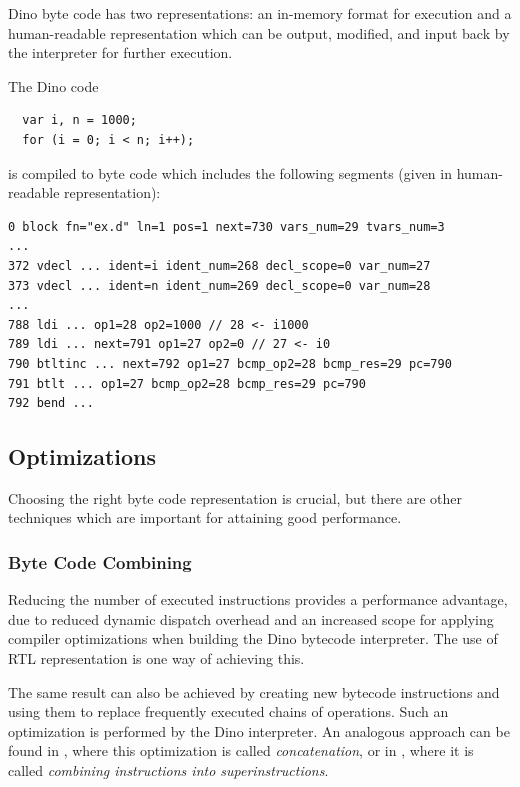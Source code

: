 \documentclass[preprint]{sigplanconf}
\begin{document}
  Dino byte code has two representations: an in-memory format for execution
and a human-readable representation which can be output, modified, and input
back by the interpreter for further execution.

  The Dino code

{\footnotesize
\begin{verbatim}
  var i, n = 1000;
  for (i = 0; i < n; i++);
\end{verbatim}
}

  is compiled to byte code which includes the following segments (given in human-readable representation):
 
{\scriptsize
\begin{verbatim}
0 block fn="ex.d" ln=1 pos=1 next=730 vars_num=29 tvars_num=3
...
372 vdecl ... ident=i ident_num=268 decl_scope=0 var_num=27
373 vdecl ... ident=n ident_num=269 decl_scope=0 var_num=28
...
788 ldi ... op1=28 op2=1000 // 28 <- i1000
789 ldi ... next=791 op1=27 op2=0 // 27 <- i0
790 btltinc ... next=792 op1=27 bcmp_op2=28 bcmp_res=29 pc=790
791 btlt ... op1=27 bcmp_op2=28 bcmp_res=29 pc=790
792 bend ...
\end{verbatim}
}


\subsection{Optimizations}

  Choosing the right byte code representation is
crucial, but there are other techniques %
which are important for attaining good performance.

\subsubsection{Byte Code Combining}

  Reducing the number of executed instructions provides a performance advantage,
due to reduced dynamic dispatch overhead and an
increased scope for applying compiler optimizations when building the Dino bytecode interpreter. The use of RTL representation is one way of achieving this.

  The same result can also be achieved by creating new bytecode instructions and using them to 
replace frequently executed chains of operations. Such an optimization
is performed by the Dino interpreter. An analogous approach can be found in
\cite{Abdelrahman}, where this optimization is called \emph{concatenation}, or in
\cite{Casey}, where it is called \emph{combining instructions into superinstructions}.
\end{document}
